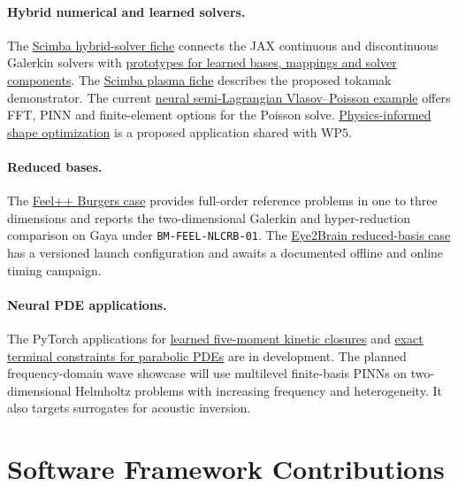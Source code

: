 \paragraph{Hybrid numerical and learned solvers.}
The \hyperref[sec:app:specs:app-scimba-hybrid]{Scimba hybrid-solver fiche}
connects the JAX continuous and discontinuous Galerkin solvers with
\href{https://gitlab.com/scimba/scimba/-/tree/1ab96a32aa3846bb59fa01b1f41cd9372f558a1b/examples/examples_jax/dg/learnable_approach}{prototypes
for learned bases, mappings and solver components}. The
\hyperref[sec:app:specs:app-scimba-plasma]{Scimba plasma fiche} describes
the proposed tokamak demonstrator. The current
\href{https://gitlab.com/scimba/scimba/-/blob/1ab96a32aa3846bb59fa01b1f41cd9372f558a1b/examples/examples_jax/time_discrete_neural_methods/neural_sl/advanced_examples/vlasov_poisson_1d_1v_bump_on_tail.py}{neural
semi-Lagrangian Vlasov--Poisson example} offers FFT, PINN and
finite-element options for the Poisson solve.
\hyperref[sec:app:specs:app-scimba-shape-opt-nn]{Physics-informed shape
optimization} is a proposed application shared with WP5.

\paragraph{Reduced bases.}
The \hyperref[sec:app:specs:app-feelpp-nlcrb]{Feel++ Burgers case}
provides full-order reference problems in one to three dimensions and
reports the two-dimensional Galerkin and hyper-reduction comparison
on Gaya under \nolinkurl{BM-FEEL-NLCRB-01}.
The \hyperref[sec:app:specs:app-feelpp-rb]{Eye2Brain reduced-basis case}
has a versioned launch configuration and awaits a documented offline
and online timing campaign.

\paragraph{Neural PDE applications.}
The PyTorch applications for \hyperref[tab:advance:WP2-A2026-2]{learned
five-moment kinetic closures} and
\hyperref[tab:advance:WP2-A2026-3]{exact terminal
constraints for parabolic PDEs} are in development. The planned
frequency-domain wave showcase will use multilevel finite-basis PINNs
on two-dimensional Helmholtz problems with increasing frequency and
heterogeneity. It also targets surrogates for acoustic inversion.

\section{Software Framework Contributions}



